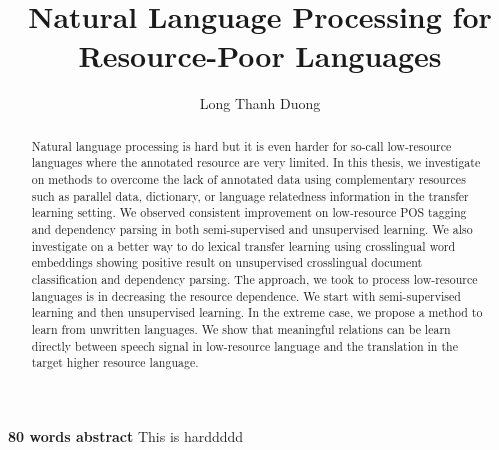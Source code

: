 
\title{Natural Language Processing for Resource-Poor Languages}
\author{Long Thanh Duong}


\maketitle
\copyrightpage


\begin{abstract}
Natural language processing is hard but it is even harder for so-call low-resource languages where the annotated resource are very limited. 
In this thesis, we investigate on methods to overcome the lack of annotated data using complementary resources such as parallel data, dictionary, 
or language relatedness information in the transfer learning setting. We observed consistent improvement on low-resource POS tagging and 
dependency parsing in both semi-supervised and unsupervised learning. We also investigate on a better way to do lexical transfer learning using 
crosslingual word embeddings showing positive result on unsupervised crosslingual document classification and dependency parsing. The approach, 
we took to process low-resource languages is in decreasing the resource dependence. We start with semi-supervised learning and then unsupervised learning. 
In the extreme case, we propose a method to learn from unwritten languages. We show that meaningful relations can be learn directly between speech signal 
in low-resource language and the translation in the target higher resource language. 

\end{abstract}


\textbf{80 words abstract}
This is harddddd 



\newpage

\tableofcontents

\listoffigures
\listoftables




